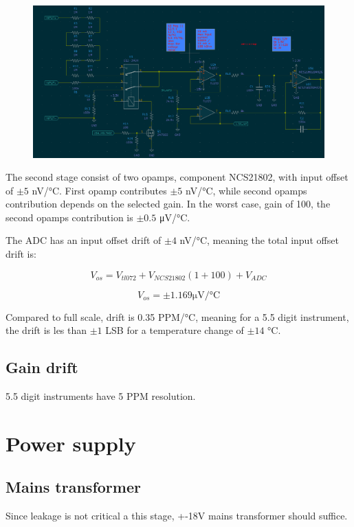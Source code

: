 \documentclass[11pt]{article}
\begin{document}
\begin{figure}[H]
  \centering 
  \includegraphics[scale=0.55]{"./figs/Input_amp.png"}
\end{figure}


The second stage consist of two opamps, component NCS21802,
with input offset of $\pm 5$ \si{\nano \volt / \celsius}. First opamp
contributes $\pm 5$ \si{\nano \volt / \celsius}, while second opamps
contribution depends on the selected gain. In the worst case, gain of 
100, the second opamps contribution is $\pm 0.5$ \si{\micro \volt / \celsius}.

The ADC has an input offset drift of $\pm 4$ \si{\nano \volt / \celsius},
meaning the total input offset drift is: 

\begin{equation}
  V_{os} = V_{tl072} + V_{NCS21802} (1 + 100) + V_{ADC}
  \label{eq:offset_1}
\end{equation}

\begin{equation}
  V_{os} = \pm 1.169 \si{\micro \volt / \celsius}
  \label{eq:offset_2}
\end{equation}

Compared to full scale, drift is 0.35 \si{PPM/\celsius},
meaning for a 5.5 digit instrument, the drift is 
les than $\pm1$ LSB for a temperature change of
$\pm 14$ \si{\celsius}.

\subsection{Gain drift}
5.5 digit instruments have 5 PPM resolution.

\pagebreak
\section{Power supply}

\subsection{Mains transformer}
Since leakage is not critical a this stage, +-18V mains transformer should suffice.
\end{document}
